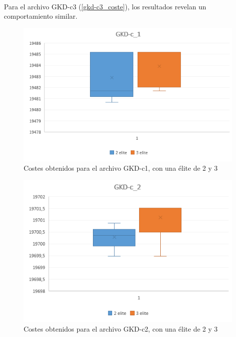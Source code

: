 	\paragraph{} Para el archivo GKD-c3  (\ref{gkd-c3_coste}), los resultados revelan un comportamiento similar.
	
	
	\begin{figure}[H]
		
		\centering
		\includegraphics[scale=0.7]{img/MPX_2vs3/GKD-c_1_Costes}
		\caption{Costes obtenidos para el archivo GKD-c1, con una élite de 2 y 3}
		\label{gkd-c1_coste}
	\end{figure}
	\begin{figure}[H]
		\centering
		\includegraphics[scale=0.7]{img/MPX_2vs3/GKD-c_2_Costes}
		\caption{Costes obtenidos para el archivo GKD-c2, con una élite de 2 y 3}
		\label{gkd-c2_coste}
		
	\end{figure}
